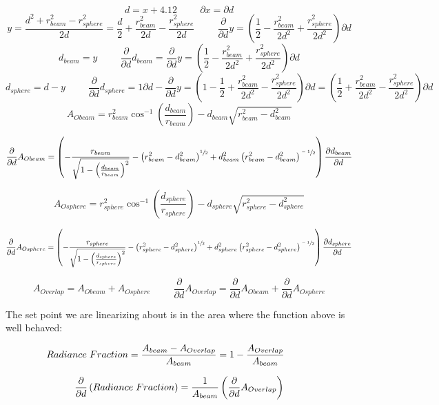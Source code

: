 \documentclass{article}
\theoremstyle{plain}
\theoremstyle{definition}
\theoremstyle{remark}
\begin{document}
$$ d = x + 4.12 \hspace{1cm} \partial x=\partial d $$
$$ y = \frac{d^2+r_{beam}^2-r_{sphere}^2}{2d}=\frac{d}{2} + \frac{r_{beam}^2}{2d} - \frac{r_{sphere}^2}{2d} \hspace{1cm} \frac{\partial}{\partial d} y = \left(\frac{1}{2}  -\frac{r_{beam}^2}{2d^2} + \frac{r_{sphere}^2}{2d^2}\right) \partial d $$
$$ d_{beam}=y \hspace{1cm} \frac{\partial}{\partial d} d_{beam} =  \frac{\partial}{\partial d} y = \left(\frac{1}{2}  -\frac{r_{beam}^2}{2d^2} + \frac{r_{sphere}^2}{2d^2}\right) \partial d $$
$$  d_{sphere}=d-y \hspace{1cm}   \frac{\partial}{\partial d} d_{sphere} = 1\partial d - \frac{\partial}{\partial d} y = \left(1 - \frac{1}{2}  +\frac{r_{beam}^2}{2d^2} - \frac{r_{sphere}^2}{2d^2}\right) \partial d = \left(\frac{1}{2}  +\frac{r_{beam}^2}{2d^2} - \frac{r_{sphere}^2}{2d^2}\right) \partial d$$
$$ A_{Obeam} = r_{beam}^2 \cos^{-1} (\frac{d_{beam}}{r_{beam}})-d_{beam} \sqrt{r_{beam}^2-d_{beam}^2}$$ 

$$ \frac{\partial}{\partial d} A_{Obeam} = \left( -\frac{r_{beam}}{\sqrt{1 - \left(\frac{d_{beam}}{r_{beam}}\right)^2}} - \left( r_{beam}^2 - d_{beam}^2\right)^{\sfrac{1}{2}} + d_{beam}^2 \left( r_{beam}^2 - d_{beam}^2\right)^{\sfrac{-1}{2}} \right) \frac{\partial d_{beam}}{\partial d}$$

$$ A_{Osphere} = r_{sphere}^2 \cos^{-1} (\frac{d_{sphere}}{r_{sphere}})-d_{sphere} \sqrt{r_{sphere}^2-d_{sphere}^2} $$

$$ \frac{\partial}{\partial d} A_{Osphere} = \left( -\frac{r_{sphere}}{\sqrt{1 - \left(\frac{d_{sphere}}{r_{sphere}}\right)^2}} - \left( r_{sphere}^2 - d_{sphere}^2\right)^{\sfrac{1}{2}} + d_{sphere}^2 \left( r_{sphere}^2 - d_{sphere}^2\right)^{\sfrac{-1}{2}} \right) \frac{\partial d_{sphere}}{\partial d}$$

$$ A_{Overlap} = A_{Obeam} + A_{Osphere} \hspace{1cm}  \frac{\partial}{\partial d} A_{Overlap} = \frac{\partial}{\partial d} A_{Obeam} + \frac{\partial}{\partial d} A_{Osphere} $$

The set point we are linearizing about is in the area where the function above is well behaved:

$$ Radiance \hspace{0.1cm} Fraction = \frac{A_{beam} - A_{Overlap}}{A_{beam}} = 1 - \frac{A_{Overlap}}{A_{beam}} \hspace{1cm} $$

$$ \frac{\partial}{\partial d} \left( Radiance \hspace{0.1cm} Fraction \right) = \frac{1}{A_{beam}} \left( \frac{\partial}{\partial d} A_{Overlap} \right) $$
\end{document}
